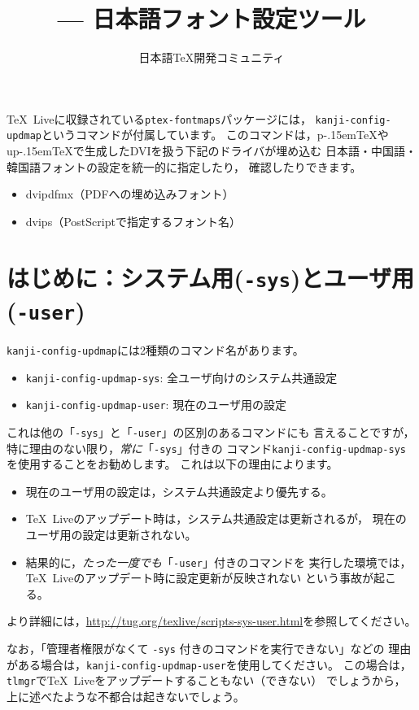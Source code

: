 \documentclass{jlreq}
\title{\command{kanji-config-updmap} --- 日本語フォント設定ツール}
\author{日本語\TeX 開発コミュニティ}
\def\file#1{\texttt{#1}}
\def\command#1{\texttt{#1}}
\def\TL{\TeX\ Live}
\def\pTeX{p\kern-.15em\TeX}
\def\upTeX{u\pTeX}
\begin{document}
\maketitle

\TL に収録されている\file{ptex-fontmaps}パッケージには，
\command{kanji-config-updmap}というコマンドが付属しています。
このコマンドは，\pTeX や\upTeX で生成したDVIを扱う下記のドライバが埋め込む
日本語・中国語・韓国語フォントの設定を統一的に指定したり，
確認したりできます。
\begin{itemize}
  \item dvipdfmx（PDFへの埋め込みフォント）
  \item dvips（PostScriptで指定するフォント名）
\end{itemize}

\section{はじめに：システム用(\command{-sys})とユーザ用(\command{-user})}

\command{kanji-config-updmap}には2種類のコマンド名があります。
\begin{itemize}
  \item \command{kanji-config-updmap-sys}: 全ユーザ向けのシステム共通設定
  \item \command{kanji-config-updmap-user}: 現在のユーザ用の設定
\end{itemize}
これは他の「\command{-sys}」と「\command{-user}」の区別のあるコマンドにも
言えることですが，特に理由のない限り，\emph{常に}「\command{-sys}」付きの
コマンド\command{kanji-config-updmap-sys}を使用することをお勧めします。
これは以下の理由によります。
\begin{itemize}
  \item 現在のユーザ用の設定は，システム共通設定より優先する。
  \item \TL のアップデート時は，システム共通設定は更新されるが，
        現在のユーザ用の設定は更新されない。
  \item 結果的に，\emph{たった一度でも}「\command{-user}」付きのコマンドを
        実行した環境では，\TL のアップデート時に設定更新が反映されない
        という事故が起こる。
\end{itemize}
より詳細には，\url{http://tug.org/texlive/scripts-sys-user.html}を参照してください。

なお，「管理者権限がなくて \command{-sys} 付きのコマンドを実行できない」などの
理由がある場合は，\command{kanji-config-updmap-user}を使用してください。
この場合は，\command{tlmgr}で\TL をアップデートすることもない（できない）
でしょうから，上に述べたような不都合は起きないでしょう。
\end{document}
